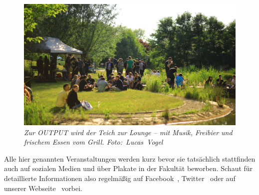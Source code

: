 \begin{figure}[b!]
  \centering
  \includegraphics[width=\linewidth]{img/output_pond}
  \caption*{\small \centering \textit{Zur OUTPUT wird der Teich zur Lounge -- mit Musik, Freibier und frischem Essen vom Grill. Foto:~Lucas~Vogel}}
\end{figure}



Alle hier genannten Veranstaltungen werden kurz bevor sie tatsächlich stattfinden auch auf sozialen Medien und über Plakate in der Fakultät beworben. Schaut für detaillierte Informationen also regelmäßig auf Facebook~, Twitter~ oder auf unserer Webseite~ vorbei.
